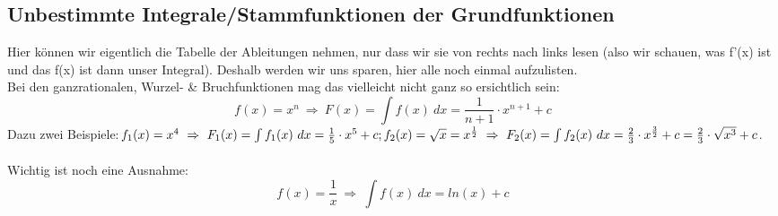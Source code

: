 \subsection{Unbestimmte Integrale/Stammfunktionen der Grundfunktionen}
Hier können wir eigentlich die Tabelle der Ableitungen nehmen, nur dass wir sie von rechts nach links lesen (also wir schauen, was f'(x) ist und das f(x) ist dann unser Integral). Deshalb werden wir uns sparen, hier alle noch einmal aufzulisten.\\
Bei den ganzrationalen, Wurzel- \& Bruchfunktionen mag das vielleicht nicht ganz so ersichtlich sein:
\[f(x)=x^n\ \Rightarrow\ F(x)=\int f(x)\ dx=\frac{1}{n+1}\cdot x^{n+1}+c\]
Dazu zwei Beispiele:\(f_1(x)=x^4\ \Rightarrow\ F_1(x)=\int f_1(x)\ dx=\frac{1}{5}\cdot x^5+c;\\
 f_2(x)=\sqrt{x}=x^\frac{1}{2}\ \Rightarrow\ F_2(x)=\int f_2(x)\ dx=\frac{2}{3}\cdot x^{\frac{3}{2}}+c=\frac{2}{3}\cdot \sqrt{x^3}+c\).\\ \\
Wichtig ist noch eine Ausnahme:
\[f(x)=\frac{1}{x}\ \Rightarrow\ \int f(x)\ dx=ln(x)+c\]

